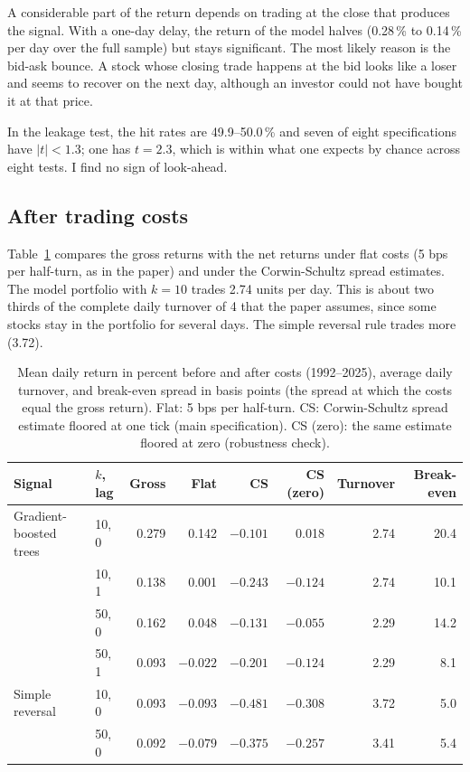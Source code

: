 \documentclass[11pt,a4paper]{article}
\theoremstyle{definition}
\theoremstyle{remark}
\begin{document}
A considerable part of the return depends on trading at the close that
produces the signal. With a one-day delay, the return of the model halves
(0.28\,\% to 0.14\,\% per day over the full sample) but stays significant. The
most likely reason is the bid-ask bounce. A stock whose closing trade happens
at the bid looks like a loser and seems to recover on the next day, although
an investor could not have bought it at that price.

In the leakage test, the hit rates are 49.9--50.0\,\% and seven of eight
specifications have $|t| < 1.3$; one has $t = 2.3$, which is within what one
expects by chance across eight tests. I find no sign of look-ahead.

\subsection{After trading costs}

Table~\ref{tab:costs} compares the gross returns with the net returns under
flat costs (5 bps per half-turn, as in the paper) and under the
Corwin-Schultz spread estimates. The model portfolio with $k = 10$ trades
2.74 units per day. This is about two thirds of the complete daily turnover of
4 that the paper assumes, since some stocks stay in the portfolio for several
days. The simple reversal rule trades more (3.72).

\begin{table}[ht]
\centering
\caption{Mean daily return in percent before and after costs (1992--2025),
average daily turnover, and break-even spread in basis points (the spread at
which the costs equal the gross return). Flat: 5 bps per half-turn. CS:
Corwin-Schultz spread estimate floored at one tick (main specification).
CS (zero): the same estimate floored at zero (robustness check).}
\label{tab:costs}
\small
\setlength{\tabcolsep}{5pt}
\begin{tabular}{llrrrrrr}
\toprule
Signal & $k$, lag & Gross & Flat & CS & CS (zero) & Turnover & Break-even \\
\midrule
Gradient-boosted trees & 10, 0 & 0.279 & 0.142 & $-0.101$ & 0.018 & 2.74 & 20.4 \\
                       & 10, 1 & 0.138 & 0.001 & $-0.243$ & $-0.124$ & 2.74 & 10.1 \\
                       & 50, 0 & 0.162 & 0.048 & $-0.131$ & $-0.055$ & 2.29 & 14.2 \\
                       & 50, 1 & 0.093 & $-0.022$ & $-0.201$ & $-0.124$ & 2.29 & 8.1 \\
\midrule
Simple reversal        & 10, 0 & 0.093 & $-0.093$ & $-0.481$ & $-0.308$ & 3.72 & 5.0 \\
                       & 50, 0 & 0.092 & $-0.079$ & $-0.375$ & $-0.257$ & 3.41 & 5.4 \\
\bottomrule
\end{tabular}
\end{table}
\end{document}
